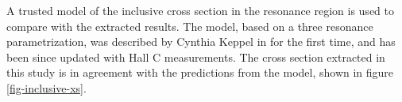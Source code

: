 A trusted model of the inclusive cross section in the resonance region is used to compare with the extracted results.  The model, based on a three resonance parametrization, was described by Cynthia Keppel in \cite{theses-keppel:1994} for the first time, and has been since updated with Hall C measurements.  The cross section extracted in this study is in agreement with the predictions from the model, shown in figure \ref{fig-inclusive-xs}.  


